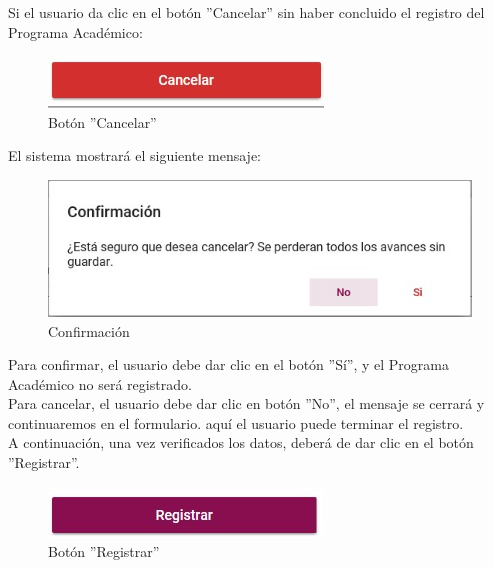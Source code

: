         Si el usuario da clic en el botón ''Cancelar'' sin haber concluido el registro del Programa Académico:

        \begin{figure}[H]
            \centering
            \hypertarget{cancel1}{\includegraphics[width=0.7\linewidth]{images/SP3/BtnCancelar}}
            \caption{Botón ''Cancelar''}
            \label{cancel1}
        \end{figure}

         El sistema mostrará el siguiente mensaje:

        \begin{figure}[H]
            \centering
            \hypertarget{confirmar}{\includegraphics[width=0.7\linewidth]{images/SP3/Confirmacion}}
            \caption{Confirmación}
            \label{confirmar}
        \end{figure}

        Para confirmar, el usuario debe dar clic en el botón ''Sí'', y el Programa Académico no será registrado.\\

        Para cancelar, el usuario debe dar clic en botón ''No'', el mensaje se cerrará y continuaremos en el formulario. aquí el usuario puede terminar el registro.\\

        A continuación, una vez verificados los datos, deberá de dar clic en el botón ''Registrar''.
        \begin{figure}[H]
            \centering
            \hypertarget{btnreg}{\includegraphics[width=0.7\linewidth]{images/SP3/BtnRegistrar}}
            \caption{Botón ''Registrar''}
            \label{btnreg}
        \end{figure}

